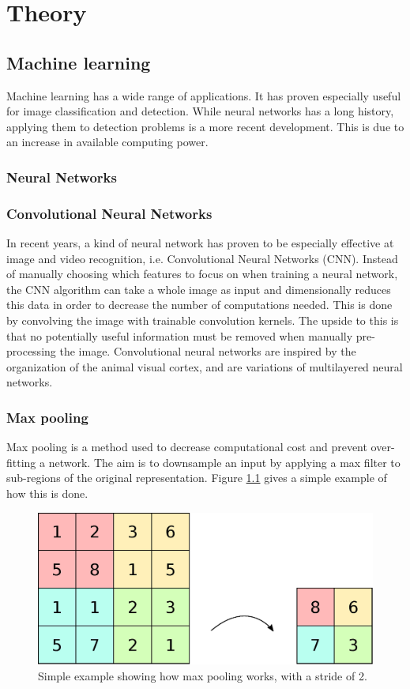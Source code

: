 \chapter{Theory}\label{cha:intro}

\section{Machine learning}\label{sec:research:history}
Machine learning has a wide range of applications. It has proven especially useful for image classification and detection. While neural networks has a long history, applying them to detection problems is a more recent development. This is due to an increase in available computing power.
\subsection{Neural Networks}\label{sec:research:history}

\subsection{Convolutional Neural Networks}
In recent years, a kind of neural network has proven to be especially effective at image and video recognition, i.e. Convolutional Neural Networks (CNN). Instead of manually choosing which features to focus on when training a neural network, the CNN algorithm can take a whole image as input and dimensionally reduces this data in order to decrease the number of computations needed. This is done by convolving the image with trainable convolution kernels. The upside to this is that no potentially useful information must be removed when manually pre-processing the image.
Convolutional neural networks are inspired by the organization of the animal visual cortex, and are variations of multilayered neural networks.

\subsection{Max pooling}
Max pooling is a method used to decrease computational cost and prevent over-fitting a network. The aim is to downsample an input by applying a max filter to sub-regions of the original representation. Figure \ref{fig:maxpooling} gives a simple example of how this is done.

\begin{figure}[h!]
    \centering
    \includegraphics[width=\textwidth]{maxpooling}
    \caption{Simple example showing how max pooling works, with a stride of 2.}
    \label{fig:maxpooling}
\end{figure}

